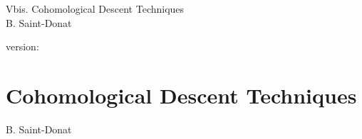 \documentclass[10pt]{../fichiers-configuration-latex/smfart}
\begin{document}
\begin{center}
Vbis. Cohomological Descent Techniques\\
B. Saint-Donat
\end{center}

version: \showgitstatus
\tableofcontents

\else
\chapter{Cohomological Descent Techniques}
\begin{center}
B. Saint-Donat
\end{center}
\fi
{}\label{sga4.exp.Vbis}

\setcounter{pageoriginal}{83}


\let\cosk=\cosq
\let\Ysheaf=\sheaf


































\end{document}
